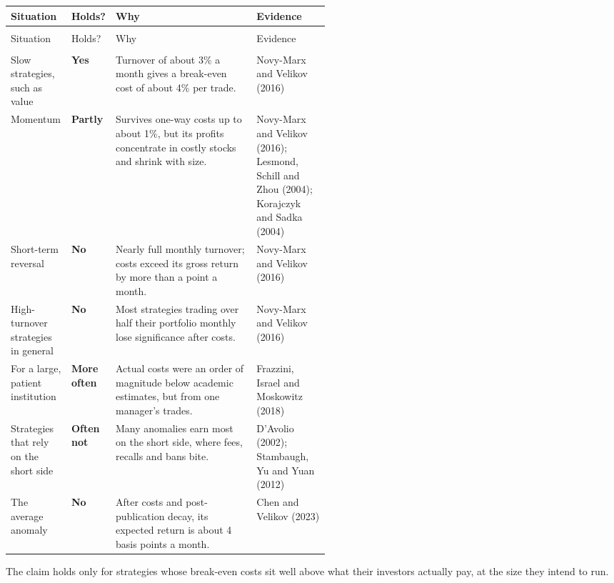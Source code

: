 {\small
\begin{longtable}{@{}>{\raggedright\arraybackslash}p{0.19\linewidth}>{\raggedright\arraybackslash}p{0.10\linewidth}>{\raggedright\arraybackslash}p{}>{\raggedright\arraybackslash}p{0.23\linewidth}@{}}
\toprule
Situation & Holds? & Why & Evidence \\
\midrule
\endfirsthead
\multicolumn{4}{@{}l}{\emph{(continued)}} \\
\toprule
Situation & Holds? & Why & Evidence \\
\midrule
\endhead
\midrule
\multicolumn{4}{r@{}}{\emph{(continued on the next page)}} \\
\endfoot
\bottomrule
\endlastfoot
Slow strategies, such as value & \textbf{Yes} & Turnover of about 3\% a month gives a break-even cost of about 4\% per trade. & Novy-Marx and Velikov (2016) \\
\addlinespace[3pt]
Momentum & \textbf{Partly} & Survives one-way costs up to about 1\%, but its profits concentrate in costly stocks and shrink with size. & Novy-Marx and Velikov (2016); Lesmond, Schill and Zhou (2004); Korajczyk and Sadka (2004) \\
\addlinespace[3pt]
Short-term reversal & \textbf{No} & Nearly full monthly turnover; costs exceed its gross return by more than a point a month. & Novy-Marx and Velikov (2016) \\
\addlinespace[3pt]
High-turnover strategies in general & \textbf{No} & Most strategies trading over half their portfolio monthly lose significance after costs. & Novy-Marx and Velikov (2016) \\
\addlinespace[3pt]
For a large, patient institution & \textbf{More often} & Actual costs were an order of magnitude below academic estimates, but from one manager's trades. & Frazzini, Israel and Moskowitz (2018) \\
\addlinespace[3pt]
Strategies that rely on the short side & \textbf{Often not} & Many anomalies earn most on the short side, where fees, recalls and bans bite. & D'Avolio (2002); Stambaugh, Yu and Yuan (2012) \\
\addlinespace[3pt]
The average anomaly & \textbf{No} & After costs and post-publication decay, its expected return is about 4 basis points a month. & Chen and Velikov (2023) \\
\end{longtable}
}

The claim holds only for strategies whose break-even costs sit well above what their investors actually pay, at the size they intend to run.

